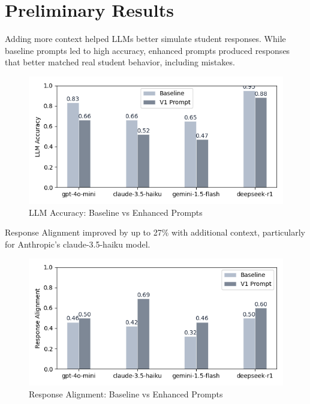\documentclass[
    a4paper, %
    10pt, %
    twoside %
]{LTJournalArticle}
\begin{document}
\section{Preliminary Results}

Adding more context helped LLMs better simulate student responses. While baseline prompts led to high accuracy, enhanced prompts produced responses that better matched real student behavior, including mistakes.

\begin{figure}[H]
    \centering
    \includegraphics[width=\columnwidth]{../latex/images/llm_accuracy_comparison.png}
    \caption{LLM Accuracy: Baseline vs Enhanced Prompts}
    \label{fig:llm-accuracy}
\end{figure}

Response Alignment improved by up to 27\% with additional context, particularly for Anthropic's claude-3.5-haiku model. 

\begin{figure}[H]
    \centering
    \includegraphics[width=\columnwidth]{../latex/images/response_alignment_comparison.png}
    \caption{Response Alignment: Baseline vs Enhanced Prompts}
    \label{fig:response-alignment}
\end{figure}
\end{document}
